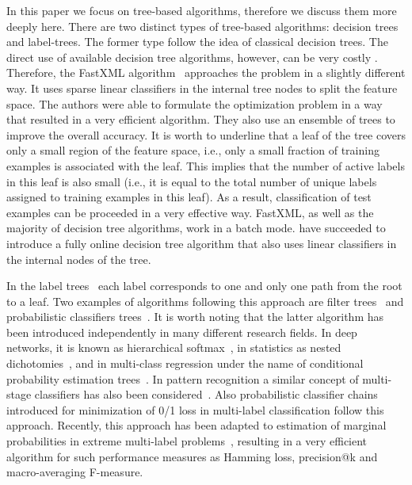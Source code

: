 \documentclass{article}
\begin{document}
In this paper we focus on tree-based algorithms, therefore we discuss them more deeply here. There are two distinct types of tree-based algorithms: decision trees and label-trees. The former type follow the idea of classical decision trees. The direct use of available decision tree algorithms, however, can be very costly \citep{Agrawal_et_al_2013}. Therefore, the FastXML algorithm~\citep{Prabhu_Varma_2014} approaches the problem in a slightly different way. It uses sparse linear classifiers in the internal tree nodes to split the feature space. The authors were able to formulate the optimization problem in a way that resulted in a very efficient algorithm. They also use an ensemble of trees to improve the overall accuracy. It is worth to underline that a leaf of the tree covers only a small region of the feature space, i.e., only a small fraction of training examples is associated with the leaf. This implies that the number of active labels in this leaf is also small (i.e., it is equal to the total number of unique labels assigned to training examples in this leaf). As a result, classification of test examples can be proceeded in a very effective way. FastXML, as well as the majority of decision tree algorithms, work in a batch mode. \citet{Choromanska_Langford_2015} have succeeded to introduce a fully online decision tree algorithm that also uses linear classifiers in the internal nodes of the tree.

In the label trees~\citep{Bengio_et_al_2010} each label corresponds to one and only one path from the root to a leaf. Two examples of algorithms following this approach are filter trees~\citep{Beygelzimer_et_al_2009a,Li_Lin_2014} and probabilistic classifiers trees~\citep{Dembczynski_et_al_2016}. It is worth noting that the latter algorithm has been introduced independently in many different research fields. In deep networks, it is known as hierarchical softmax~\citep{Morin_Bengio_2005}, in statistics as nested dichotomies~\citep{Fox_1997}, and in multi-class regression under the name of conditional probability estimation trees~\citep{Beygelzimer_et_al_2009b}. In pattern recognition a similar concept of multi-stage classifiers has also been considered~\citep{Kurzynski_1988}. Also probabilistic classifier chains~\citep{Dembczynski_et_al_2010c} introduced for minimization of 0/1 loss in multi-label classification follow this approach. Recently, this approach has been adapted to estimation of marginal probabilities in extreme multi-label problems~\citep{Jasinska_et_al_2016}, resulting in a very efficient algorithm for such performance measures as Hamming loss, precision@k and macro-averaging F-measure.
\end{document}
